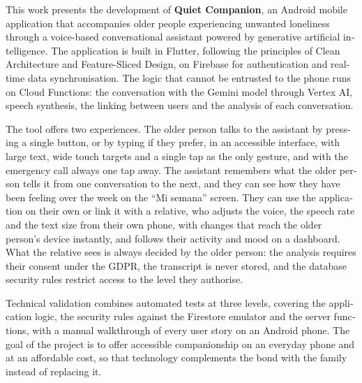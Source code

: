 \vspace{0.5cm}
\par\vspace{\baselineskip}
\begin{otherlanguage}{english}
\setlength{\emergencystretch}{1em}%

This work presents the development of \textbf{Quiet Companion}, an Android mobile application that accompanies older people experiencing unwanted loneliness through a voice-based conversational assistant powered by generative artificial intelligence. The application is built in Flutter, following the principles of Clean Architecture and Feature-Sliced Design, on Firebase for authentication and real-time data synchronisation. The logic that cannot be entrusted to the phone runs on Cloud Functions: the conversation with the Gemini model through Vertex AI, speech synthesis, the linking between users and the analysis of each conversation.

The tool offers two experiences. The older person talks to the assistant by pressing a single button, or by typing if they prefer, in an accessible interface, with large text, wide touch targets and a single tap as the only gesture, and with the emergency call always one tap away. The assistant remembers what the older person tells it from one conversation to the next, and they can see how they have been feeling over the week on the ``Mi semana'' screen. They can use the application on their own or link it with a relative, who adjusts the voice, the speech rate and the text size from their own phone, with changes that reach the older person's device instantly, and follows their activity and mood on a dashboard. What the relative sees is always decided by the older person: the analysis requires their consent under the GDPR, the transcript is never stored, and the database security rules restrict access to the level they authorise.

Technical validation combines automated tests at three levels, covering the application logic, the security rules against the Firestore emulator and the server functions, with a manual walkthrough of every user story on an Android phone. The goal of the project is to offer accessible companionship on an everyday phone and at an affordable cost, so that technology complements the bond with the family instead of replacing it.

\vspace{0.4cm}
\par\vspace
 {\baselineskip}
\end{otherlanguage}


